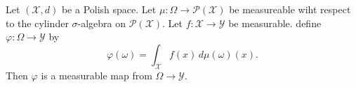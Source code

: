 \begin{lemma}
  \label{lem:random_dist_test_function_measureable_Polish}
  \notready
  Let $(\mathcal{X}, d)$ be a Polish space. Let $\mu : \Omega \to \mathcal{P}(\mathcal{X})$ be measureable wiht respect to the cylinder $\sigma$-algebra on $\mathcal{P}(\mathcal{X})$. Let $f : \mathcal{X} \to \mathcal{Y}$ be measurable. define $\varphi : \Omega \to \mathcal{Y}$ by
  \[
  \varphi(\omega) = \int_{\mathcal{X}}f(x) \, d\mu(\omega)(x).
  \]
  Then $\varphi$ is a measurable map from $\Omega \to \mathcal{Y}$.


\end{lemma}

